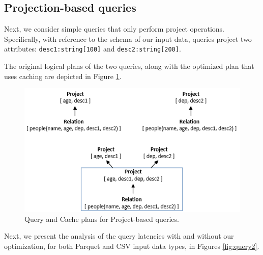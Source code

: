 \subsection{Projection-based queries}
Next, we consider simple queries that only perform project operations. Specifically, with reference to the schema of our input data, queries project two attributes: \texttt{desc1:string[100]} and \texttt{desc2:string[200]}.

The original logical plans of the two queries, along with the optimized plan that uses caching are depicted in Figure \ref{fig:query2_plans}.

\begin{figure}[!htb]
   \centering
   \includegraphics[scale=0.5]{figures/query2_cacheplan}
   \caption{Query and Cache plans for Project-based queries.} 
   \label{fig:query2_plans}
\end{figure}

Next, we present the analysis of the query latencies with and without our optimization, for both Parquet and CSV input data types, in Figures \ref{fig:query2}.

